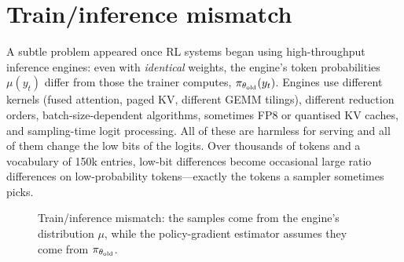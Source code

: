 \section{Train/inference mismatch}\label{sec:rlsys:mismatch}

A subtle problem appeared once RL systems began using high-throughput inference engines: even
with \emph{identical} weights, the engine's token probabilities $\mu(y_t)$ differ from those the
trainer computes, $\pi_{\theta_{\text{old}}}(y_t)$. Engines use different kernels (fused attention, paged KV,
different GEMM tilings), different reduction orders, batch-size-dependent algorithms,
sometimes FP8 or quantised KV caches, and sampling-time logit processing. All of these are
harmless for serving and all of them change the low bits of the logits. Over thousands of
tokens and a vocabulary of 150k entries, low-bit differences become occasional large ratio
differences on low-probability tokens---exactly the tokens a sampler sometimes picks.

\begin{figure}[t]
\centering
{}
\caption{Train/inference mismatch: the samples come from the engine's distribution $\mu$,
while the policy-gradient estimator assumes they come from $\pi_{\theta_{\text{old}}}$.}
\label{fig:rlsys:mismatch}
\end{figure}

